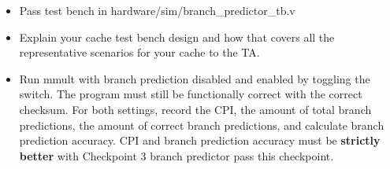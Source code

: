 \begin{itemize}
    \item Pass test bench in hardware/sim/branch\_predictor\_tb.v
    \item Explain your cache test bench design and how that covers all the representative scenarios for your cache to the TA.
    \item Run mmult with branch prediction disabled and enabled by toggling the switch. The program must still be functionally correct with the correct checksum. For both settings, record the CPI, the amount of total branch predictions, the amount of correct branch predictions, and calculate branch prediction accuracy. CPI and branch prediction accuracy must be \textbf{strictly better} with Checkpoint 3 branch predictor pass this checkpoint.
\end{itemize}

\newpage
